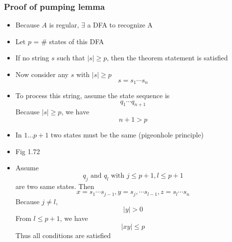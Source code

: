 \begin{frame}[allowframebreaks] \frametitle{Proof of pumping lemma}
\begin{itemize}
\item Because $A$ is regular, $\exists$ a DFA
   to recognize A
 \item [] Let $p$ = \# states of this DFA
 \item If no string $s$ such that
   $|s| \geq p$, then the theorem statement is satisfied

\item Now consider any $s$ with $|s| \geq p$
  \begin{equation*}
    s = s_1 \cdots s_n
  \end{equation*}
\item To process this string, assume the
  state sequence is 
  \begin{equation*}
q_1 \cdots q_{n+1}
\end{equation*}
Because $|s|\geq p$, we have
\begin{equation*}
n+1 > p
\end{equation*}

\item In 
$1\ldots p+1$ two states must be the same (pigeonhole principle)

\item [] Fig 1.72


  \begin{center}
\end{center}

\item Assume 
  \begin{equation*}
q_j \text{ and } q_l \text{ with } j \leq p+1, l \leq p+1
\end{equation*}
are two same states. Then
\begin{equation*}
x = s_1 \cdots s_{j-1},
y = s_j,  \cdots s_{l-1},
z = s_l \cdots s_n
\end{equation*}
Because $j \neq l$, 
\begin{equation*}
|y| > 0
\end{equation*}
From $l \leq p+1$, we have
\begin{equation*}
|xy| \leq p
\end{equation*}
Thus all conditions are satisfied
\end{itemize}\end{frame} 


